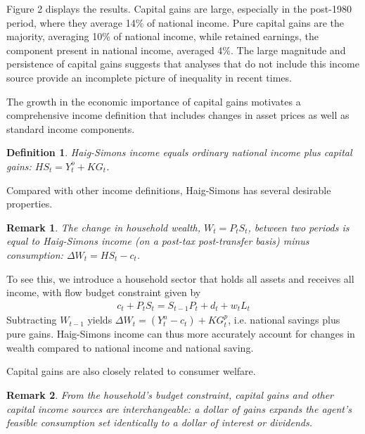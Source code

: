 \documentclass[12pt]{article}
\newtheorem{definition}{Definition}
\newtheorem{remark}{Remark}
\begin{document}
Figure 2 displays the results. Capital gains are large, especially in the post-1980 period, where they average 14\% of national income. Pure capital gains are the majority, averaging 10\% of national income, while retained earnings, the component present in national income, averaged 4\%. The large magnitude and persistence of capital gains suggests that analyses that do not include this income source provide an incomplete picture of inequality in recent times.

The growth in the economic importance of capital gains motivates a comprehensive income definition that includes changes in asset prices as well as standard income components. 
\begin{definition} \label{def:hs} Haig-Simons income \citep{haig1921concept, simons1938personal} equals ordinary national income plus capital gains: $HS_t = Y_t^{o} + KG_t$. \end{definition} 


Compared with other income definitions, Haig-Simons has several desirable properties. 
\begin{remark} \label{remark:hs_sav} The change in household wealth, $W_t = P_t S_t$, between two periods is equal to Haig-Simons income (on a post-tax post-transfer basis) minus consumption: $\Delta W_t = HS_t - c_t$. \end{remark} 
\noindent To see this, we introduce a household sector that holds all assets and receives all income, with flow budget constraint given by 
\begin{align}
\label{eq:agent_bc}
c_t +  P_t S_t = S_{t-1}P_t + d_t +  w_t L_t  
\end{align}
Subtracting $W_{t-1}$ yields $\Delta W_t = (Y_t^n - c_t) + KG_t^p$, i.e. national savings plus pure gains. Haig-Simons income can thus more accurately account for changes in wealth compared to national income and national saving. 

Capital gains are also closely related to consumer welfare.
\begin{remark} \label{remark:hs_inc}  From the household's budget constraint, capital gains and other capital income sources are interchangeable: a dollar of gains expands the agent's feasible consumption set identically to a dollar of interest or dividends.   \end{remark} 
\end{document}
